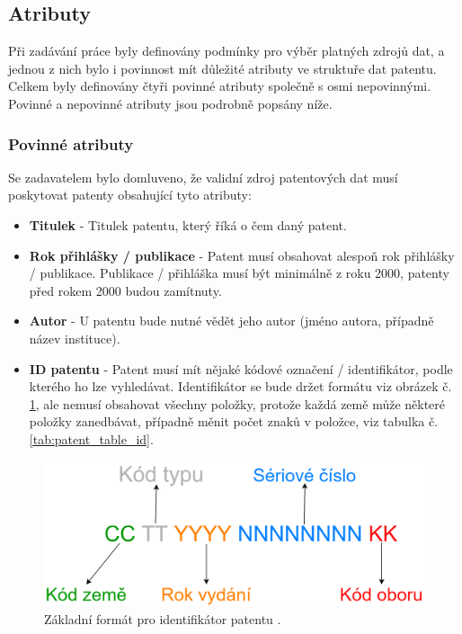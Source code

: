 \subsection{Atributy}\label{subsec:atributy}
Při zadávání práce byly definovány podmínky pro výběr platných zdrojů dat, a jednou z nich bylo i povinnost mít důležité atributy ve struktuře dat patentu. Celkem byly definovány čtyři povinné atributy společně s osmi nepovinnými. Povinné a nepovinné atributy jsou podrobně popsány níže.
\subsubsection{Povinné atributy}
Se zadavatelem bylo domluveno, že validní zdroj patentových dat musí poskytovat patenty obsahující tyto atributy:
\begin{itemize}
\item \textbf{Titulek} - Titulek patentu, který říká o čem daný patent.
\item \textbf{Rok přihlášky / publikace} - Patent musí obsahovat alespoň rok přihlášky / publikace. Publikace / přihláška musí být minimálně z roku 2000, patenty před rokem 2000 budou zamítnuty.
\item \textbf{Autor} - U patentu bude nutné vědět jeho autor (jméno autora, případně název instituce).
\item \textbf{ID patentu} - Patent musí mít nějaké kódové označení / identifikátor, podle kterého ho lze vyhledávat. Identifikátor se bude držet formátu viz obrázek č. \ref{fig:patent_id}, ale nemusí obsahovat všechny položky, protože každá země může některé položky zanedbávat, případně měnit počet znaků v položce, viz tabulka č. \ref{tab:patent_table_id}.
\end{itemize}

	\begin{figure}[H]
	\centering
	\includegraphics[width=12cm]{img/patent_id}
	\caption{Základní formát pro identifikátor patentu \cite{patent_id_format}.}
	\label{fig:patent_id}
	\end{figure}

